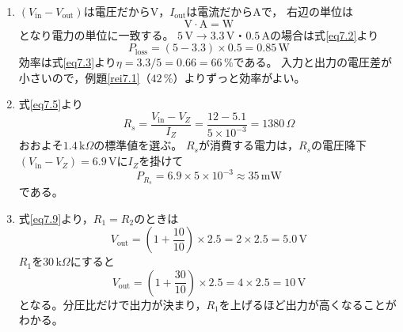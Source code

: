 \answer
\begin{enumerate}

\item[7.1節 問1]
$(V_{\mathrm{in}}-V_{\mathrm{out}})$は電圧だからV，$I_{\mathrm{out}}$は電流だからAで，
右辺の単位は
\begin{equation*}
\mathrm{V \cdot A} = \mathrm{W}
\end{equation*}
となり電力の単位に一致する。
$5$\,V$\to 3.3$\,V・$0.5$\,Aの場合は式\ref{eq7.2}より
\begin{equation*}
P_{\mathrm{loss}} = (5 - 3.3)\times0.5 = 0.85\,\mathrm{W}
\end{equation*}
効率は式\ref{eq7.3}より$\eta = 3.3/5 = 0.66 = 66\,\%$である。
入力と出力の電圧差が小さいので，例題\ref{rei7.1}（$42\,\%$）よりずっと効率がよい。

\item[7.2節 問2]
式\ref{eq7.5}より
\begin{equation*}
R_s = \frac{V_{\mathrm{in}} - V_Z}{I_Z}
= \frac{12 - 5.1}{5\times10^{-3}} = 1380\,\Omega
\end{equation*}
おおよそ$1.4$\,k$\Omega$の標準値を選ぶ。
$R_s$が消費する電力は，$R_s$の電圧降下$(V_{\mathrm{in}}-V_Z)=6.9$\,Vに$I_Z$を掛けて
\begin{equation*}
P_{R_s} = 6.9 \times 5\times10^{-3} \approx 35\,\mathrm{mW}
\end{equation*}
である。

\item[7.3節 問3]
式\ref{eq7.9}より，$R_1 = R_2$のときは
\begin{equation*}
V_{\mathrm{out}} = \left(1 + \frac{10}{10}\right)\times2.5 = 2\times2.5 = 5.0\,\mathrm{V}
\end{equation*}
$R_1$を$30$\,k$\Omega$にすると
\begin{equation*}
V_{\mathrm{out}} = \left(1 + \frac{30}{10}\right)\times2.5 = 4\times2.5 = 10\,\mathrm{V}
\end{equation*}
となる。分圧比だけで出力が決まり，$R_1$を上げるほど出力が高くなることがわかる。

\end{enumerate}
